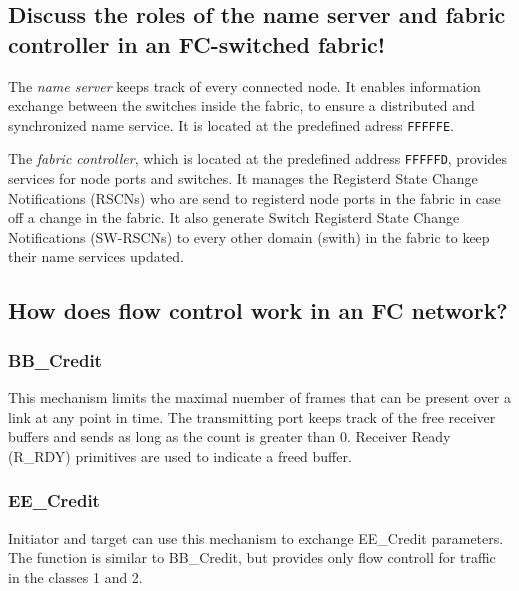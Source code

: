 \subsection{Discuss the roles of the name server and fabric controller in an FC-switched fabric!} %
\label{sub:discuss_the_roles_of_the_name_server_and_fabric_controller_in_an_fc_switched_fabric}
	The \emph{name server} keeps track of every connected node.
	It enables information exchange between the switches inside the fabric,
	to ensure a distributed and synchronized name service.
	It is located at the predefined adress \texttt{FFFFFE}.

	The \emph{fabric controller},
	which is located at the predefined address \texttt{FFFFFD},
	provides services for node ports and switches.
	It manages the Registerd State Change Notifications (RSCNs)
	who are send to registerd node ports in the fabric
	in case off a change in the fabric.
	It also generate Switch Registerd State Change Notifications (SW-RSCNs)
	to every other domain (swith) in the fabric to
	keep their name services updated.

\subsection{How does flow control work in an FC network?} %
\label{sub:how_does_flow_control_work_in_an_fc_network}

	\subsubsection{BB_Credit} %
	\label{ssub:bb_credit}
		This mechanism limits the maximal nuember of frames
		that can be present over a link at any point in time.
		The transmitting port keeps track of the free receiver buffers
		and sends as long as the count is greater than 0.
		Receiver Ready (R_RDY) primitives are used to indicate a freed buffer.

	\subsubsection{EE_Credit} %
	\label{ssub:ee_credit}
		Initiator and target can use this mechanism to exchange EE_Credit parameters.
		The function is similar to BB_Credit,
		but provides only flow controll for traffic in the classes 1 and 2.

